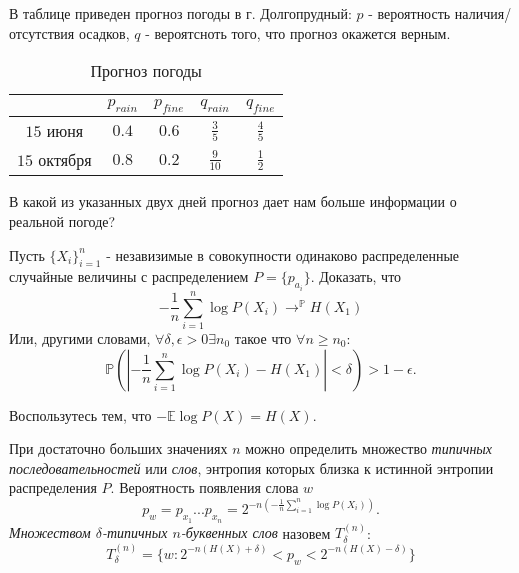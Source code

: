 \begin{problem}
В таблице приведен прогноз погоды в г. Долгопрудный:
$p$ - вероятность наличия/отсутствия осадков, $q$ - вероятсноть того, что прогноз окажется верным.
\begin{table}[h]
\caption{Прогноз погоды}
\begin{center}
\begin{tabular}{|c|c|c|c|c|}
\hline
 &$p_{rain}$  &$p_{fine}$ & $q_{rain}$ & $q_{fine}$  \\
\hline
$15$ июня & $0.4$ & $0.6$ & $\frac{3}{5}$ & $\frac{4}{5}$\\
\hline
$15$ октября & $0.8$ & $0.2$ & $\frac{9}{10}$ & $\frac{1}{2}$\\
\hline
\end{tabular}
\end{center}
\end{table}
В какой из указанных двух дней прогноз дает нам больше информации о реальной погоде?
\begin{ordre}
\end{ordre}
\end{problem}


\begin{problem}
Пусть $\{X_i\}_{i=1}^n$ - незавизимые в совокупности одинаково распределенные случайные величины с распределением $P = \{p_{a_i}\}$. Доказать, что 
\begin{equation}
-\frac{1}{n} \sum_{i = 1}^n \log P(X_i) \rightarrow^{\mathbb{P}} H(X_1)
\end{equation}
Или, другими словами, $\forall \delta, \epsilon > 0 \exists n_0$ такое что $\forall n \geq n_0$:
\begin{equation}
\mathbb{P}(|-\frac{1}{n} \sum_{i = 1}^n \log P(X_i) - H(X_1)| < \delta) > 1-\epsilon.
\end{equation}

\begin{ordre}
Воспользутесь тем, что $-\mathbb{E} \log P(X) = H(X)$.
\end{ordre}
\end{problem}

\begin{remark} При достаточно больших значениях $n$ можно определить множество \textit{типичных последовательностей} или \textit{слов}, энтропия которых близка к истинной энтропии распределения $P$. Вероятность появления слова $w$
\begin{equation}
p_w = p_{x_1}...p_{x_n} = 2^{-n (-\frac{1}{n} \sum_{i = 1}^n \log P(X_i))}.
\end{equation}
\textit{Множеством $\delta$-типичных $n$-буквенных слов} назовем $T_{\delta}^{(n)}$:
\begin{equation}
T_{\delta}^{(n)} = \{w: 2^{-n(H(X) + \delta)} < p_w < 2^{-n(H(X) - \delta)} \}
\end{equation}
\end{remark}


